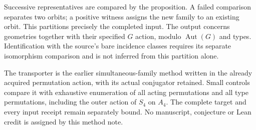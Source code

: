 \documentclass[11pt]{article}
\begin{document}
Successive representatives are compared by the proposition. A failed
comparison separates two orbits; a positive witness assigns the new
family to an existing orbit. This partitions precisely the completed
input. The output concerns geometries together with their specified
$G$ action, modulo $\operatorname{Aut}(G)$ and types. Identification
with the source's bare incidence classes requires its separate
isomorphism comparison and is not inferred from this partition alone.

The transporter is the earlier simultaneous-family method written in
the already acquired permutation action, with its actual conjugator
retained. Small controls compare it with exhaustive enumeration of all
acting permutations and all type permutations, including the outer
action of $S_4$ on $A_4$. The complete target and every input receipt
remain separately bound. No manuscript, conjecture or Lean credit is
assigned by this method note.
\end{document}
